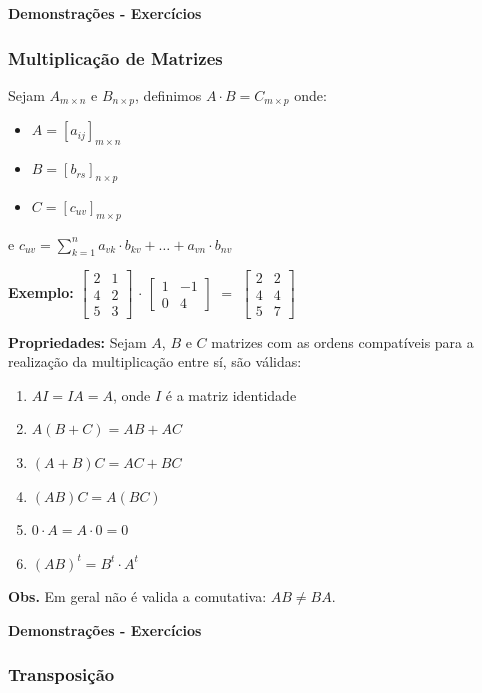 \documentclass[oneside,a4paper,12pt]{article}
\begin{document}
\textbf{Demonstrações - Exercícios}

\subsubsection{Multiplicação de Matrizes}

Sejam $A_{m \times n}$ e $B_{n \times p}$, definimos $A \cdot B = C_{m \times p}$ onde:
\begin{itemize}
	\item [] $A = [a_{ij}]_{m \times n}$
	\item [] $B = [b_{rs}]_{n \times p}$
	\item [] $C = [c_{uv}]_{m \times p}$
\end{itemize}
e $c_{uv} = \sum_{k=1}^{n}a_{vk}\cdot b_{kv} + \dots + a_{vn} \cdot b_{nv}$

\textbf{Exemplo: }
$
\left[
\begin{array}{cc}
2	&	1	\\
4	&	2	\\
5	&	3
\end{array}
\right]
$
$\cdot$
$
\left[
\begin{array}{cc}
1	&	-1	\\
0	&	4	
\end{array}
\right]
$
$=$
$
\left[
\begin{array}{cc}
	2	&	2	\\
	4	&	4	\\
	5	&	7
\end{array}
\right]
$

\textbf{Propriedades: }
Sejam $A$, $B$ e $C$ matrizes com as ordens compatíveis para a realização da multiplicação entre sí, são válidas:
\begin{enumerate}
	\item $AI = IA = A$, onde $I$ é a matriz identidade
	\item $A(B+C) = AB + AC$
	\item $(A+B)C = AC + BC$
	\item $(AB)C = A(BC)$
	\item $0\cdot A = A \cdot 0 = 0$
	\item $(AB)^t = B^t \cdot A^t$
\end{enumerate}
\textbf{Obs. }Em geral não é valida a comutativa: $AB \neq BA$.

\textbf{Demonstrações - Exercícios}

\subsubsection{Transposição}
\end{document}
